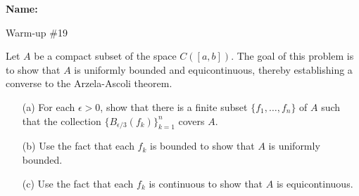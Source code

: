 \documentclass[12pt]{article}
\begin{document}
\noindent \textbf{Name:} 

\begin{center}
Warm-up \#19
\end{center}

\noindent Let $A$ be a compact subset of the space $C([a,b])$. The goal of this problem is to show that $A$ is uniformly bounded and equicontinuous, thereby establishing a converse to the Arzela-Ascoli theorem. 
\begin{enumerate}
\item[(a)] For each $\epsilon > 0$, show that there is a finite subset $\{f_1, \ldots, f_n\}$ of $A$ such that the collection $\{B_{\epsilon/3}(f_k)\}_{k=1}^n$ covers $A$. 
\item[(b)] Use the fact that each $f_k$ is bounded to show that $A$ is uniformly bounded. 
\item[(c)] Use the fact that each $f_k$ is continuous to show that $A$ is equicontinuous. 
\end{enumerate}
\end{document}
